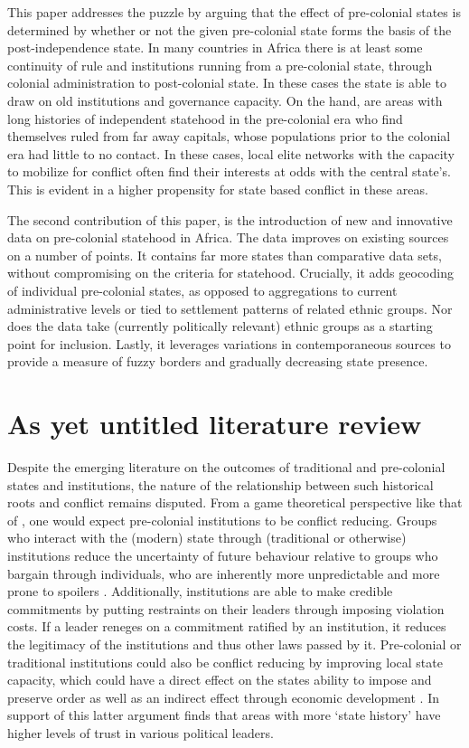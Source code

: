\documentclass[12pt]{article}
\begin{document}
This paper addresses the puzzle by arguing that the effect of pre-colonial
states is determined by whether or not the given pre-colonial state forms the
basis of the post-independence state. In many countries in Africa there is at
least some continuity of rule and institutions running from a pre-colonial
state, through colonial administration to post-colonial state. In these cases
the state is able to draw on old institutions and governance capacity. On the
hand, are areas with long histories of independent statehood in the pre-colonial
era who find themselves ruled from far away capitals, whose populations prior to
the colonial era had little to no contact. In these cases, local elite networks
with the capacity to mobilize for conflict often find their interests at odds
with the central state's. This is evident in a higher propensity for state based
conflict in these areas.

The second contribution of this paper, is the introduction of new and innovative
data on pre-colonial statehood in Africa. The data improves on existing sources on
a number of points. It contains far more states than comparative data sets,
without compromising on the criteria for statehood. Crucially, it adds geocoding
of individual pre-colonial states, as opposed to aggregations to current
administrative levels or tied to settlement patterns of related ethnic groups.
Nor does the data take (currently politically relevant) ethnic groups as
a starting point for inclusion. %
Lastly, it leverages variations in contemporaneous sources to provide a measure
of fuzzy borders and gradually decreasing state presence.

\section{As yet untitled literature review} 

Despite the emerging literature on the outcomes of traditional and pre-colonial
states and institutions, the nature of the relationship between such historical
roots and conflict remains disputed. From a game theoretical perspective like
that of \citet{Fearon1995}, one would expect pre-colonial institutions to be
conflict reducing. Groups who interact with the (modern) state through
(traditional or otherwise) institutions reduce the uncertainty of future
behaviour relative to groups who bargain through individuals, who are inherently
more unpredictable and more prone to spoilers \citep{Wig2016}. Additionally,
institutions are able to make credible commitments by putting restraints on
their leaders through imposing violation costs. If a leader reneges on a
commitment ratified by an institution, it reduces the legitimacy of the
institutions and thus other laws passed by it. Pre-colonial or traditional
institutions could also be conflict reducing by improving local state capacity,
which could have a direct effect on the states ability to impose and preserve
order as well as an indirect effect through economic development
\citep{Depetris-Chauvin2016}. In support of this latter argument
\citet{Depetris-Chauvin2016} finds that areas with more `state history' have
higher levels of trust in various political leaders.
\end{document}

